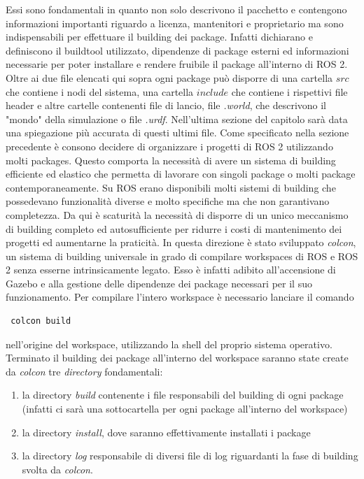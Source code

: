 \documentclass[a4paper,11 pt,oneside]{book}
\theoremstyle{definition}
\begin{document}
Essi sono fondamentali in quanto non solo descrivono il pacchetto e contengono informazioni importanti riguardo a licenza, mantenitori e proprietario ma sono indispensabili per effettuare il building dei package. Infatti dichiarano e definiscono il buildtool utilizzato, dipendenze di package esterni ed informazioni necessarie per poter installare e rendere fruibile il package all'interno di ROS 2.
Oltre ai due file elencati qui sopra ogni package può disporre di una cartella $src$ che contiene i nodi del sistema, una cartella $include$ che contiene i rispettivi file header e altre cartelle contenenti file di lancio, file \emph{.world}, che descrivono il "mondo" della simulazione o file \emph{.urdf}. Nell'ultima sezione del capitolo sarà data una spiegazione più accurata di questi ultimi file.
Come specificato nella sezione precedente è consono decidere di organizzare i progetti di ROS 2 utilizzando molti packages. Questo comporta la necessità di avere un sistema di building efficiente ed elastico che permetta di lavorare con singoli package o molti package contemporaneamente. Su ROS erano disponibili molti sistemi di building che possedevano funzionalità diverse e molto specifiche ma che non garantivano completezza. Da qui è scaturità la necessità di disporre di un unico meccanismo di building completo ed autosufficiente per ridurre i costi di mantenimento dei progetti ed aumentarne la praticità.
In questa direzione è stato sviluppato \emph{colcon}, un sistema di building universale in grado di compilare workspaces di ROS e ROS 2 senza esserne intrinsicamente legato. Esso è infatti adibito all'accensione di Gazebo e alla gestione delle dipendenze dei package necessari per il suo funzionamento.
Per compilare l'intero workspace è necessario lanciare il comando
 \begin{lstlisting}
 colcon build
\end{lstlisting}
 nell'origine del workspace, utilizzando la shell del proprio sistema operativo.
Terminato il building dei package all'interno del workspace saranno state create da \emph{colcon} tre \emph{directory} fondamentali:
\begin{enumerate}
\item la directory \emph{build} contenente i file responsabili del building di ogni package (infatti ci sarà una sottocartella per ogni package all'interno del workspace)
\item la directory \emph{install}, dove saranno effettivamente installati i package
\item la directory  \emph{log} responsabile di diversi file di log riguardanti la fase di building svolta da \emph{colcon}.
\end{enumerate}
\end{document}
